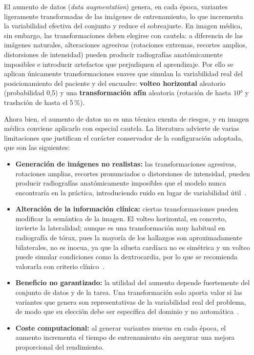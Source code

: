 El aumento de datos (\textit{data augmentation}) genera, en cada época, variantes
ligeramente transformadas de las imágenes de entrenamiento, lo que incrementa la
variabilidad efectiva del conjunto y reduce el sobreajuste. En imagen médica, sin
embargo, las transformaciones deben elegirse con cautela: a diferencia de las
imágenes naturales, alteraciones agresivas (rotaciones extremas, recortes amplios,
distorsiones de intensidad) pueden producir radiografías anatómicamente
imposibles e introducir artefactos que perjudiquen el aprendizaje. Por ello se
aplican únicamente transformaciones suaves que simulan la variabilidad real del
posicionamiento del paciente y del encuadre: \textbf{volteo horizontal} aleatorio
(probabilidad 0,5) y una \textbf{transformación afín} aleatoria (rotación de hasta
$10°$ y traslación de hasta el 5\,\%).

Ahora bien, el aumento de datos no es una técnica exenta de riesgos, y en imagen
médica conviene aplicarlo con especial cautela. La literatura advierte de varias
limitaciones que justifican el carácter conservador de la configuración adoptada, que
son las siguientes:

\begin{itemize}
  \item \textbf{Generación de imágenes no realistas:} las transformaciones agresivas,
      rotaciones amplias, recortes pronunciados o distorsiones de intensidad, pueden
        producir radiografías anatómicamente imposibles que el modelo nunca
        encontraría en la práctica, introduciendo ruido en lugar de variabilidad
        útil~\cite{hryniewskaChecklistResponsible2021}.
  \item \textbf{Alteración de la información clínica:} ciertas transformaciones pueden
        modificar la semántica de la imagen. El volteo horizontal, en concreto, invierte
        la lateralidad; aunque es una transformación muy habitual en radiografía de
        tórax, pues la mayoría de los hallazgos son aproximadamente bilaterales, no es
        inocua, ya que la silueta cardíaca no es simétrica y un volteo puede simular
        condiciones como la dextrocardia, por lo que se recomienda valorarla con
        criterio clínico~\cite{hryniewskaChecklistResponsible2021}.
  \item \textbf{Beneficio no garantizado:} la utilidad del aumento depende fuertemente
        del conjunto de datos y de la tarea. Una transformación solo aporta valor si las
        variantes que genera son representativas de la variabilidad real del problema,
        de modo que su elección debe ser específica del dominio y no
        automática~\cite{shortenSurveyImageData2019}.
  \item \textbf{Coste computacional:} al generar variantes nuevas en cada época, el
        aumento incrementa el tiempo de entrenamiento sin asegurar una mejora
        proporcional del rendimiento.
\end{itemize}

